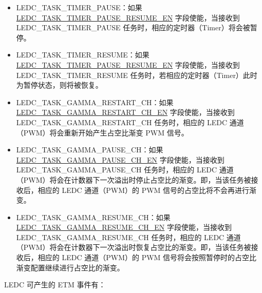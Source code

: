 \documentclass[main\_\_CN.tex]{subfiles}
\begin{document}
\begin{itemize}
\item LEDC\_TASK\_TIMER\_PAUSE：如果 \hyperref[fielddesc:LEDCTASKTIMERXPAUSERESUMEEN]{LEDC\_TASK\_TIMER\_PAUSE\_RESUME\_EN} 字段使能，当接收到 LEDC\_TASK\_TIMER\_PAUSE 任务时，相应的定时器（Timer）将会被暂停。
\item LEDC\_TASK\_TIMER\_RESUME：如果 \hyperref[fielddesc:LEDCTASKTIMERXPAUSERESUMEEN]{LEDC\_TASK\_TIMER\_PAUSE\_RESUME\_EN} 字段使能，当接收到 LEDC\_TASK\_TIMER\_RESUME 任务时，若相应的定时器（Timer）此时为暂停状态，则将被恢复。
\item LEDC\_TASK\_GAMMA\_RESTART\_CH：如果 \hyperref[fielddesc:LEDCTASKGAMMARESTARTCHNEN]{LEDC\_TASK\_GAMMA\_RESTART\_CH\_EN} 字段使能，当接收到 LEDC\_TASK\_GAMMA\_RESTART\_CH 任务时，相应的 LEDC 通道（PWM）将会重新开始产生占空比渐变 PWM 信号。
\item LEDC\_TASK\_GAMMA\_PAUSE\_CH：如果 \hyperref[fielddesc:LEDCTASKGAMMAPAUSECHNEN]{LEDC\_TASK\_GAMMA\_PAUSE\_CH\_EN} 字段使能，当接收到 LEDC\_TASK\_GAMMA\_PAUSE\_CH 任务时，相应的 LEDC 通道（PWM）将会在计数器下一次溢出时停止占空比的渐变。即，当该任务被接收后，相应的 LEDC 通道（PWM）的 PWM 信号的占空比将不会再进行渐变。
\item LEDC\_TASK\_GAMMA\_RESUME\_CH：如果 \hyperref[fielddesc:LEDCTASKGAMMARESUMECHNEN]{LEDC\_TASK\_GAMMA\_RESUME\_CH\_EN} 字段使能，当接收到 LEDC\_TASK\_GAMMA\_RESUME\_CH 任务时，相应的 LEDC 通道（PWM）将会在计数器下一次溢出时恢复占空比的渐变。即，当该任务被接收后，相应的 LEDC 通道（PWM）的 PWM 信号将会按照暂停时的占空比渐变配置继续进行占空比的渐变。
\end{itemize}

LEDC 可产生的 ETM 事件有：
\end{document}
